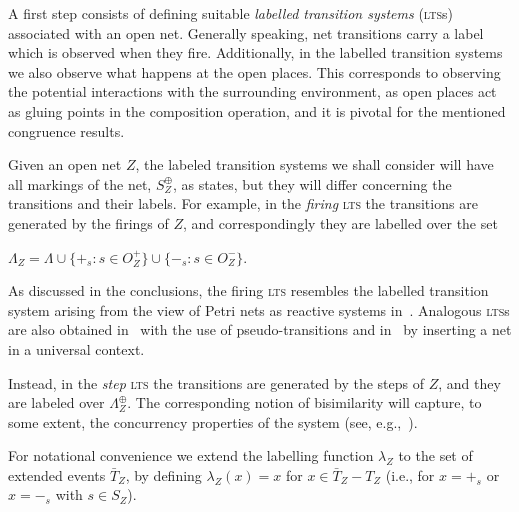 \documentclass{LMCS}
\newcommand{\monSub}[2]{\ensuremath{{#1}_{#2}^\oplus}}
\begin{document}
\noindent
A first step consists of defining suitable \emph{labelled transition
  systems} (\textsc{lts}s) associated with an open net.  Generally
speaking, net transitions carry a label which is observed when they
fire. Additionally, in the labelled transition systems we
also observe what happens at the open places. This corresponds to
observing the potential interactions with the surrounding environment,
as open places act as gluing points in the composition operation, and
it is pivotal for the mentioned congruence results.

Given an open net $Z$, the labeled transition systems we
shall consider will have all markings of the net, $\monSub{S}{Z}$, as
states, but they will differ concerning the transitions and their
labels. For example, in the \emph{firing} \textsc{lts} the transitions
are generated by the firings of $Z$, and correspondingly they are
labelled over the set
\begin{center}
  $\Lambda_Z = \Lambda \cup \{ +_s : s \in O_Z^+ \} \cup \{ -_s
  : s \in O_Z^- \}$.
\end{center}
As discussed in the conclusions, the firing \textsc{lts} resembles the
labelled transition system arising from the view of Petri nets as
reactive systems in~\cite{Mil:BRS,SS:CPN}.
Analogous \textsc{lts}s are also obtained in~\cite{v:modular-petri}
with the use of pseudo-transitions and in~\cite{NPS:CBCP} by
inserting a net in a universal context.

Instead, in the \emph{step} \textsc{lts} the transitions are generated by
the steps of $Z$, and they are labeled over   $\monSub{\Lambda}{Z}$.
The
corresponding notion of bisimilarity will capture, to some extent, the
concurrency properties of the system (see,
e.g.,~\cite{Vog:BAR,NT:DNDC}).











For notational convenience we extend the labelling function
$\lambda_Z$ to the set of extended events $\bar{T}_Z$, by defining
$\lambda_Z(x) = x$ for $x \in \bar{T}_Z -T_Z$ (i.e., for $x = +_s$ or
$x= -_s$ with $s \in S_Z$).
\end{document}
